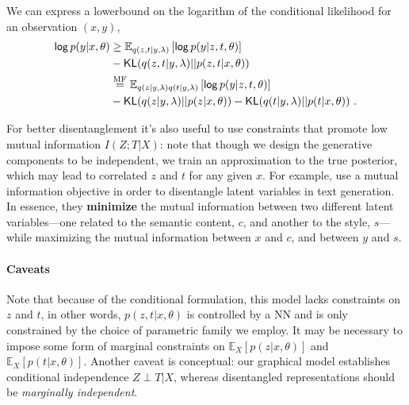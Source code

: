 We can express a lowerbound on the logarithm of the conditional likelihood for an observation $(x,y)$,
\begin{align}
    \operatorname*{\mathsf{log}} p(y|x, \theta) & \ge \mathbb E_{q(z,t|y,\lambda)}\left[ \operatorname*{\mathsf{log}} p(y|z,t, \theta) \right] \nonumber                                \\
                        & - \operatorname{\mathsf{KL}}(q(z, t|y,\lambda) || p(z, t|x, \theta))                                                                 \\
                        & \overset{\text{MF}}{=} \mathbb E_{q(z|y,\lambda)q(t|y,\lambda)}\left[ \operatorname*{\mathsf{log}} p(y|z,t, \theta) \right] \nonumber \\
                        & - \operatorname{\mathsf{KL}}(q(z|y,\lambda) || p(z|x,\theta)) - \operatorname{\mathsf{KL}}(q(t|y,\lambda) || p(t|x, \theta)) ~.
\end{align}

For better disentanglement it's also useful to use constraints that
promote low mutual information $I(Z;T|X)$: note that though we design
the generative components to be independent, we train an
approximation to the true posterior, which may lead to correlated $z$
and $t$ for any given $x$. For example,
\citet{chengImprovingDisentangledText2020} use a mutual information
objective in order to disentangle latent variables in text
generation. In essence, they {\bf minimize} the mutual information
between two different latent variables---one related to the semantic
content, $c$, and another to the style, $s$---while maximizing the
mutual information between $x$ and $c$, and between $y$ and $s$.

\paragraph*{Caveats} Note that because of the conditional formulation,
this model lacks constraints on $z$ and $t$, in other words,
$p(z,t|x,\theta)$ is controlled by a NN and is only constrained by
the choice of parametric family we employ. It may be necessary to
impose some form of marginal constraints on $\mathbb
    E_X[p(z|x,\theta)]$ and $\mathbb E_X[p(t|x,\theta)]$. Another caveat
is conceptual: our graphical model establishes conditional
independence $Z \perp T | X$, whereas disentangled representations
should be \emph{marginally independent}.


